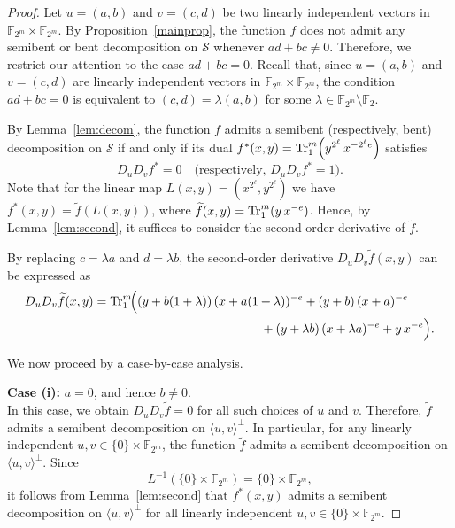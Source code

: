 \documentclass[12pt]{article}
\theoremstyle{plain}
\theoremstyle{definition}
\newcommand{\Tr}{{\rm Tr}}
\begin{document}
	\begin{proof} Let $u=(a,b)$ and $v=(c,d)$ be two linearly independent vectors in
		$\mathbb{F}_{2^{m}} \times \mathbb{F}_{2^{m}}$.
		By Proposition~\ref{mainprop}, the function $f$ does not admit any semibent or bent
		decomposition on $\mathcal{S}$ whenever $ad+bc \neq 0$.
		Therefore, we restrict our attention to the case $ad+bc = 0$.
		Recall that, since $u=(a,b)$ and $v=(c,d)$ are linearly independent vectors in
		$\mathbb{F}_{2^{m}} \times \mathbb{F}_{2^{m}}$, the condition $ad+bc = 0$
		is equivalent to $(c,d)=\lambda (a,b)$ for some $ \lambda \in \mathbb{F}_{2^{m}} \setminus \mathbb{F}_{2}$.
		
		By Lemma~\ref{lem:decom}, the function $f$ admits a semibent (respectively, bent)
		decomposition on $\mathcal{S}$ if and only if its dual $f^{\ast}(x,y)=\Tr_1^{m}\!\left(y^{2^\ell}\,x^{-2^\ell e}\right)$
		satisfies
		\[
		D_u D_v f^{\ast}=0
		\quad\text{(respectively, } D_u D_v f^{\ast}=1\text{).}
		\]
		Note that for the linear map $L(x,y)=(x^{2^\ell},y^{2^\ell})$ we have 
		$f^{\ast}(x,y)=\widetilde{f}(L(x,y))$, where 
		$\widetilde{f}(x,y)=\Tr_1^{m}(y\,x^{-e})$.
		Hence, by Lemma~\ref{lem:second}, it suffices to consider the second-order derivative of $\widetilde{f}$.
		
		By replacing $c=\lambda a$ and $d=\lambda b$,
		the second-order derivative $D_u D_v \widetilde{f}(x,y)$ can be expressed as
		\begin{align*}
			D_u D_v \widetilde{f}(x,y)
			=
			\Tr_1^{m}\!\Big(
			&(y+b(1+\lambda))\,(x+a(1+\lambda))^{-e}
			+(y+b)\,(x+a)^{-e} \\
			& \qquad \qquad \qquad \qquad\qquad +(y+\lambda b)\,(x+\lambda a)^{-e}
			+y\,x^{-e}
			\Big).
		\end{align*}
		
		We now proceed by a case-by-case analysis.
		
		\medskip
		
		\noindent \textbf{Case (i):}  $a=0$, and hence $b\neq 0$.  \\[.3em]
		In this case, we obtain $D_u D_v \widetilde{f}=0$ for all such choices of $u$ and $v$.
		Therefore, $ \widetilde{f}$ admits a semibent decomposition on $\langle u,v\rangle^{\perp}$.
		In particular, for any linearly independent 
		$u,v \in \{0\}\times \mathbb{F}_{2^{m}}$, 
		the function $\widetilde{f}$ admits a semibent decomposition on $\langle u,v\rangle^{\perp}$.
		Since 
		\[
		L^{-1}(\{0\}\times \mathbb{F}_{2^{m}})
		=
		\{0\}\times \mathbb{F}_{2^{m}},
		\]
		it follows from Lemma~\ref{lem:second} that 
		$f^{*}(x,y)$ admits a semibent decomposition on 
		$\langle u,v\rangle^{\perp}$ for all linearly independent 
		$u,v \in \{0\}\times \mathbb{F}_{2^{m}}$.
		

\end{proof}
\end{document}
